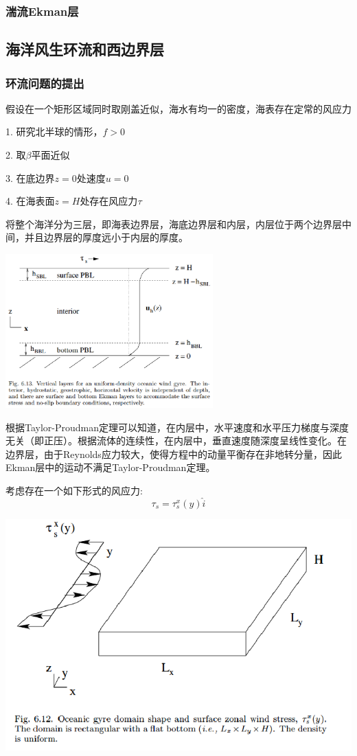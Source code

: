 \documentclass{article}
\begin{document}
\subsubsection{湍流Ekman层}

\subsection{海洋风生环流和西边界层}
\subsubsection{环流问题的提出}
假设在一个矩形区域同时取刚盖近似，海水有均一的密度，海表存在定常的风应力

1. 研究北半球的情形，$f>0$

2. 取$\beta$平面近似

3. 在底边界$z=0$处速度$u=0$

4. 在海表面$z=H$处存在风应力$\tau$

将整个海洋分为三层，即海表边界层，海底边界层和内层，内层位于两个边界层中间，并且边界层的厚度远小于内层的厚度。
\begin{center}
    \includegraphics[width=8cm]{Fig5_1.png}
\end{center}

根据Taylor-Proudman定理可以知道，在内层中，水平速度和水平压力梯度与深度无关（即正压）。根据流体的连续性，在内层中，垂直速度随深度呈线性变化。在边界层，由于Reynolds应力较大，使得方程中的动量平衡存在非地转分量，因此Ekman层中的运动不满足Taylor-Proudman定理。

考虑存在一个如下形式的风应力:
$$\tau_s = \tau_s^x(y) \hat{i}$$
\begin{center}
    \includegraphics[width=0.5\linewidth]{Fig5_3.png}
\end{center}
\end{document}
